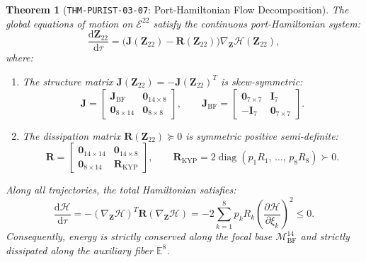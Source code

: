 \documentclass[11pt,a4paper,reqno]{article}
\theoremstyle{plain}
\newtheorem{theorem}{Theorem}[section]
\theoremstyle{definition}
\theoremstyle{remark}
\numberwithin{equation}{section}
\providecommand{\diff}{\mathrm{d}}
\begin{document}
\begin{theorem}[\texttt{THM-PURIST-03-07}: Port-Hamiltonian Flow Decomposition]
\label{thm:port_hamiltonian_flow}
The global equations of motion on $\mathcal{E}^{22}$ satisfy the continuous port-Hamiltonian system:
\begin{equation}
  \frac{\diff\bm{Z}_{22}}{\diff\tau} = \Big( \mathbf{J}(\bm{Z}_{22}) - \mathbf{R}(\bm{Z}_{22}) \Big) \nabla_{\bm{Z}} \mathcal{H}(\bm{Z}_{22}),
  \label{eq:port_hamiltonian_ode}
\end{equation}
where:
\begin{enumerate}[label=(\roman*),leftmargin=1.8em]
  \item The structure matrix $\mathbf{J}(\bm{Z}_{22}) = -\mathbf{J}(\bm{Z}_{22})^T$ is skew-symmetric:
  \begin{equation}
    \mathbf{J} = \begin{bmatrix} \mathbf{J}_{\mathrm{BF}} & \bm{0}_{14 \times 8} \\ \bm{0}_{8 \times 14} & \bm{0}_{8 \times 8} \end{bmatrix}, \qquad \mathbf{J}_{\mathrm{BF}} = \begin{bmatrix} \bm{0}_{7 \times 7} & \mathbf{I}_7 \\ -\mathbf{I}_7 & \bm{0}_{7 \times 7} \end{bmatrix}.
  \end{equation}
  \item The dissipation matrix $\mathbf{R}(\bm{Z}_{22}) \succeq 0$ is symmetric positive semi-definite:
  \begin{equation}
    \mathbf{R} = \begin{bmatrix} \bm{0}_{14 \times 14} & \bm{0}_{14 \times 8} \\ \bm{0}_{8 \times 14} & \mathbf{R}_{\mathrm{KYP}} \end{bmatrix}, \qquad \mathbf{R}_{\mathrm{KYP}} = 2 \operatorname{diag}(p_1 R_1, \, \dots, \, p_8 R_8) \succ 0.
  \end{equation}
\end{enumerate}
Along all trajectories, the total Hamiltonian satisfies:
\begin{equation}
  \frac{\diff\mathcal{H}}{\diff\tau} = -\left( \nabla_{\bm{Z}} \mathcal{H} \right)^T \mathbf{R} \left( \nabla_{\bm{Z}} \mathcal{H} \right) = -2 \sum_{k=1}^8 p_k R_k \left( \frac{\partial \mathcal{H}}{\partial \xi_k} \right)^2 \le 0.
\end{equation}
Consequently, energy is strictly conserved along the focal base $\mathcal{M}_{\mathrm{BF}}^{14}$ and strictly dissipated along the auxiliary fiber $\mathbb{E}^8$.
\end{theorem}
\end{document}
